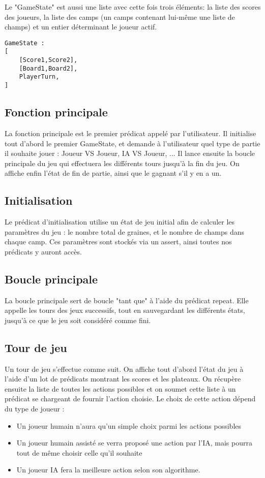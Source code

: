 \documentclass[]{article}
\begin{document}
Le "GameState" est aussi une liste avec cette fois trois éléments: la liste des scores des joueurs, la liste des camps (un camps contenant lui-même une liste de champs) et un entier déterminant le joueur actif.
\begin{verbatim}
GameState :
[
	[Score1,Score2],
	[Board1,Board2],
	PlayerTurn, 
]
\end{verbatim}

\subsection{Fonction principale}

La fonction principale est le premier prédicat appelé par l'utilisateur. Il initialise tout d'abord le premier GameState, et demande à l'utilisateur quel type de partie il souhaite jouer : Joueur VS Joueur, IA VS Joueur, ... Il lance ensuite la boucle principale du jeu qui effectuera les différents tours jusqu'à la fin du jeu. On affiche enfin l'état de fin de partie, ainsi que le gagnant s'il y en a un.

\subsection{Initialisation}

Le prédicat d'initialisation utilise un état de jeu initial afin de calculer les paramètres du jeu : le nombre total de graines, et le nombre de champs dans chaque camp. Ces paramètres sont stockés via un assert, ainsi toutes nos prédicats y auront accès.

\subsection{Boucle principale}

La boucle principale sert de boucle "tant que" à l'aide du prédicat repeat. Elle appelle les tours des jeux successifs, tout en sauvegardant les différents états, jusqu'à ce que le jeu soit considéré comme fini.

\subsection{Tour de jeu}

Un tour de jeu s'effectue comme suit. On affiche tout d'abord l'état du jeu à l'aide d'un lot de prédicats montrant les scores et les plateaux. On récupère ensuite la liste de toutes les actions possibles et on soumet cette liste à un prédicat se chargeant de fournir l'action choisie. Le choix de cette action dépend du type de joueur : 
\begin{itemize}
\item Un joueur humain n'aura qu'un simple choix parmi les actions possibles
\item Un joueur humain assisté se verra proposé une action par l'IA, mais pourra tout de même choisir celle qu'il souhaite
\item Un joueur IA fera la meilleure action selon son algorithme.
\end{itemize}
\end{document}
